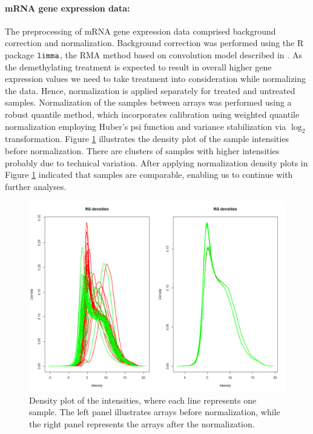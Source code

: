 \paragraph{mRNA gene expression data:}

 The preprocessing of mRNA gene expression data comprised background correction and normalization. Background correction was performed using the R package ${\tt limma}$, the RMA method based on convolution model described in \cite{Ritchie2007, Silver2008}. As the demethylating treatment is expected to result in overall higher gene expression values we need to take treatment into consideration while normalizing the data. Hence, normalization is applied separately for treated and untreated samples. Normalization of the samples between arrays was performed using a robust quantile method, which incorporates calibration using weighted quantile normalization employing Huber's psi function and variance stabilization via $\log_2$ transformation. Figure \ref{fig:mRNAnormalization} illustrates the density plot of the sample intensities before normalization. There are clusters of samples with higher intensities probably due to technical variation. After applying normalization density plots in Figure \ref{fig:mRNAnormalization} indicated that samples are comparable, enabling us to continue with  further analyses.  

\begin{figure}[h!]
\centering
\includegraphics[scale=0.3]{mRNA-DensityPlot.jpeg}  
\caption{Density plot of the intensities, where each line represents one sample. The left panel illustrates arrays before normalization, while the right panel represents the arrays after the normalization.}
\label{fig:mRNAnormalization}
\end{figure}

